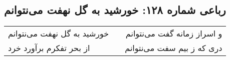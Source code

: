\begin{center}
\section*{رباعی شماره ۱۲۸: خورشید به گل نهفت می‌نتوانم}
\label{sec:sh128}
\begin{longtable}{l p{0.5cm} r}
خورشید به گل نهفت می‌نتوانم
&&
و اسراز زمانه گفت می‌نتوانم
\\
از بحر تفکرم برآورد خرد
&&
دری که ز بیم سفت می‌نتوانم
\\
\end{longtable}
\end{center}
